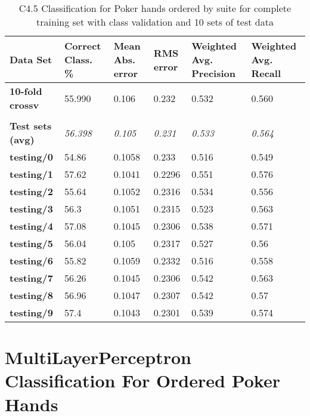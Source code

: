 \documentclass[10pt, a4paper]{article}
\begin{document}
\begin{table}[htbp]
  \centering
  \begin{tabular}{p{3cm}p{1.5cm}p{1.5cm}p{1.5cm}p{1.5cm}p{1.5cm}}
    \toprule
    \textbf{Data Set} & Correct Class. \% & Mean Abs. error & RMS error & Weighted Avg. Precision & Weighted Avg. Recall \\
    \midrule
    \textbf{10-fold crossv} & 55.990 & 0.106 & 0.232 & 0.532 & 0.560 \\
    \textbf{} &       &       &       &       &  \\
    \textbf{Test sets (avg)} & \textit{56.398} & \textit{0.105} & \textit{0.231} & \textit{0.533} & \textit{0.564} \\
    \textbf{   testing/0} & 54.86 & 0.1058 & 0.233 & 0.516 & 0.549 \\
    \textbf{   testing/1} & 57.62 & 0.1041 & 0.2296 & 0.551 & 0.576 \\
    \textbf{   testing/2} & 55.64 & 0.1052 & 0.2316 & 0.534 & 0.556 \\
    \textbf{   testing/3} & 56.3  & 0.1051 & 0.2315 & 0.523 & 0.563 \\
    \textbf{   testing/4} & 57.08 & 0.1045 & 0.2306 & 0.538 & 0.571 \\
    \textbf{   testing/5} & 56.04 & 0.105 & 0.2317 & 0.527 & 0.56 \\
    \textbf{   testing/6} & 55.82 & 0.1059 & 0.2332 & 0.516 & 0.558 \\
    \textbf{   testing/7} & 56.26 & 0.1045 & 0.2306 & 0.542 & 0.563 \\
    \textbf{   testing/8} & 56.96 & 0.1047 & 0.2307 & 0.542 & 0.57 \\
    \textbf{   testing/9} & 57.4  & 0.1043 & 0.2301 & 0.539 & 0.574 \\
    \bottomrule
    \end{tabular}%


	\caption{C4.5 Classification for Poker hands ordered by suite for complete training set with class validation and 10 sets of test data}   
  \label{tab:nnosresults}%
\end{table}%

\clearpage

\section{MultiLayerPerceptron Classification For Ordered Poker Hands}
\end{document}
